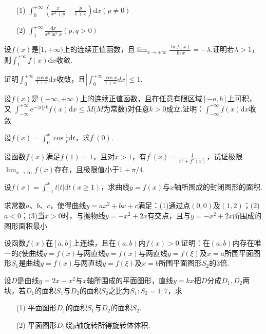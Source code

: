 \begin{xiti}
\begin{enumerate}
	\item [(1)]$\int_{0}^{+\infty}\left(\frac{x}{x^{2}+p}-\frac{p}{1+x}\right) \mathrm{d} x(p \neq 0)$
	\item [(2)]$\int_{1}^{+\infty} \frac{\mathrm{d} x}{x^{p} \ln ^{q} x}(p, q>0)$
\end{enumerate}
\item 设$f(x)$是$[1,+\infty)$上的连续正值函数，且$\lim _{x \rightarrow+\infty} \frac{\ln f(x)}{\ln x}=-\lambda$.证明若$\lambda>1$，则$\int_{1}^{+\infty} f(x) \mathrm{d} x$收敛.
\item 证明$\int_{0}^{+\infty} \frac{\cos x}{1+x}  \mathrm{d} x$收敛，且$\left|\int_{0}^{+\infty} \frac{\cos x}{1+x} d x\right| \leqslant 1$.
\item 设$f(x)$是$(-\infty,+\infty)$上的连续正值函数，且在任意有限区域$[-a,b]$上可积，又
$\int_{-\infty}^{+\infty} \mathrm{e}^{-|x| / k} f(x) \mathrm{d} x \leqslant M$($M$为常数)对任意$k>0$成立.证明：$\int_{-\infty}^{+\infty} f(x) \mathrm{d} x$收敛

\item 设$f(x)=\int_{0}^{x} \cos \frac{1}{t} \mathrm{d}t$，求$f^{\prime}(0)$.
\item 设函数$f(x)$满足$f(1)=1$，且对$x>1$，有$f^{\prime}(x)=\frac{1}{x^{2}+f^{2}(x)}$，试证极限$\lim _{x \rightarrow \infty} f(x)$存在，且极限值小于$1+\pi / 4$.

\item  设$f(x)=\int_{-1}^{x} t|t| \mathrm{d} t(x \geqslant 1)$，求曲线$y=f(x)$与$x$轴所围成的封闭图形的面积.
\item 求常数$a$、$b$、$c$，使得曲线$y=a x^{2}+b x+c$满足：(1)通过点$(0,0)$及$(1,2)$；(2)$a<0$；(3)当$x>0$时，与抛物线$y=-x^{2}+2 x$有交点，且与$y=-x^{2}+2 x$所围成的图形面积最小
\item 设函数$f(x)$在$[a,b]$上连续，且在$(a,b)$内$f(x)>0$.证明：在$(a,b)$内存在唯一的$\xi $使曲线$y=f(x)$与两直线$y=f(x)$与两直线$y=f(\xi )$及$x=a$所围平面图形$S_{1}$是曲线$y=f(x)$与两直线$y=f(\xi )$及$x=b$所围平面图形$S_{2}$的3倍.
\item 设$D$是曲线$y=2 x-x^{2}$与$x$轴所围成的平面图形，直线$y=kx$把$D$分成$D_{1},D_{2}$两块，若$D_{1}$的面积$S_{1}$与$D_{2}$的面积$S_{2}$之比为$S_{1}:S_{2}=1:7$，求
\begin{enumerate}
	\item [(1)] 平面图形$D_{1}$的面积$S_{1}$与$D_{2}$的面积$S_{2}$.
	\item [(2)] 平面图形$D_{1}$绕$y$轴旋转所得旋转体体积.
\end{enumerate}


\end{xiti}
